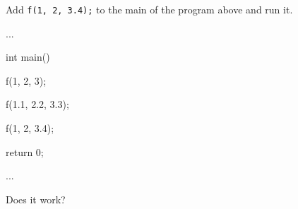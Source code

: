 Add \texttt{f(1, 2, 3.4);} to the main of the program above and run it.



\begin{consolethree}[escapeinside=||]

...



int main()

{

    f(1, 2, 3);

    f(1.1, 2.2, 3.3);

    f(1, 2, 3.4);

    return 0;

}



...

\end{consolethree}



Does it work?

